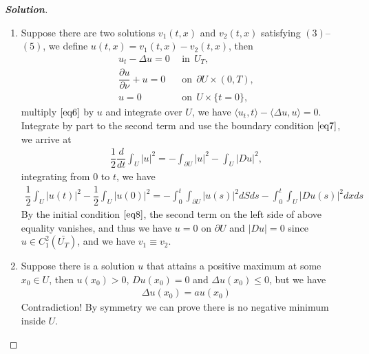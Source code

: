 \documentclass[11pt,reqno]{amsart}
\newcommand{\<}{\langle}
\renewcommand{\>}{\rangle}
\newcommand{\norm}[1]{\vert#1\vert}
\begin{document}
\begin{enumerate}[label={\arabic*.}]
\begin{proof}[\bf{Solution}]
\leavevmode
\begin{enumerate}
\item Suppose there are two solutions $v_1(t,x)$ and $v_2(t,x)$ satisfying $(3)$--$(5)$, we define $u(t,x) = v_1(t,x) - v_2(t,x)$, then
\begin{align}
u_t - \Delta u = 0\ \  & \text{in} \ \ U_T,
\label{eq6}\\
\dfrac{\partial u}{\partial \nu} + u = 0
\label{eq7}\ \ & \text{on}\ \  \partial U \times (0, T),\\
u=0 \ \ & \text{on}\ \ U\times \{t=0\},
\label{eq8}
\end{align}
multiply $\eqref{eq6}$ by $u$ and integrate over $U$, we have
$\langle u_t, t \rangle -\langle \Delta u, u \rangle = 0$. Integrate by part to the second term and use the boundary condition $\eqref{eq7}$, we arrive at
\begin{align*}
\dfrac{1}{2} \dfrac{d}{dt}\int_U \norm{u}^2 = -\int_{\partial U} \norm{u}^2 -\int_U \norm{Du}^2,
\end{align*}
integrating from $0$ to $t$, we have
\begin{align*}
\dfrac{1}{2} \int_U \norm{u(t)}^2 - \dfrac{1}{2} \int_U \norm{u(0)}^2= -\int_0^t \int_{\partial U} \norm{u(s)}^2 dS ds - \int_0^t \int_U \norm{Du(s)}^2 dxds
\end{align*}
By the initial condition $\eqref{eq8}$, the second term on the left side of above equality vanishes, and thus we have $u=0$ on $\partial U$ and $\norm{Du} = 0$ since $u\in C_1^2(\bar{U_T})$, and we have $v_1 \equiv v_2$.
\item Suppose there is a solution $u$ that attains a positive maximum at some $x_0 \in U$, then $u(x_0) >0$, $Du(x_0) = 0$ and $\Delta u(x_0) \leq 0$, but we have
\begin{align*}
\Delta u (x_0) = au(x_0)
\end{align*}
Contradiction! By symmetry we can prove there is no negative minimum inside $U$.
\end{enumerate}
\end{proof}

\end{enumerate}
\end{document}
